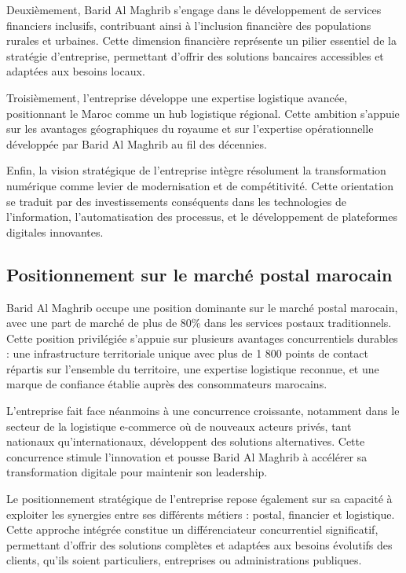 Deuxièmement, Barid Al Maghrib s'engage dans le développement de services financiers inclusifs, contribuant ainsi à l'inclusion financière des populations rurales et urbaines. Cette dimension financière représente un pilier essentiel de la stratégie d'entreprise, permettant d'offrir des solutions bancaires accessibles et adaptées aux besoins locaux.

Troisièmement, l'entreprise développe une expertise logistique avancée, positionnant le Maroc comme un hub logistique régional. Cette ambition s'appuie sur les avantages géographiques du royaume et sur l'expertise opérationnelle développée par Barid Al Maghrib au fil des décennies.

Enfin, la vision stratégique de l'entreprise intègre résolument la transformation numérique comme levier de modernisation et de compétitivité. Cette orientation se traduit par des investissements conséquents dans les technologies de l'information, l'automatisation des processus, et le développement de plateformes digitales innovantes.

\subsection{Positionnement sur le marché postal marocain}

Barid Al Maghrib occupe une position dominante sur le marché postal marocain, avec une part de marché de plus de 80\% dans les services postaux traditionnels. Cette position privilégiée s'appuie sur plusieurs avantages concurrentiels durables : une infrastructure territoriale unique avec plus de 1 800 points de contact répartis sur l'ensemble du territoire, une expertise logistique reconnue, et une marque de confiance établie auprès des consommateurs marocains.

L'entreprise fait face néanmoins à une concurrence croissante, notamment dans le secteur de la logistique e-commerce où de nouveaux acteurs privés, tant nationaux qu'internationaux, développent des solutions alternatives. Cette concurrence stimule l'innovation et pousse Barid Al Maghrib à accélérer sa transformation digitale pour maintenir son leadership.

Le positionnement stratégique de l'entreprise repose également sur sa capacité à exploiter les synergies entre ses différents métiers : postal, financier et logistique. Cette approche intégrée constitue un différenciateur concurrentiel significatif, permettant d'offrir des solutions complètes et adaptées aux besoins évolutifs des clients, qu'ils soient particuliers, entreprises ou administrations publiques.

